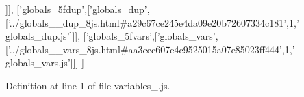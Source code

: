 \begin{DoxyCode}
  [\textcolor{stringliteral}{'globals\_5f\_5fvars\_5f8js'},[\textcolor{stringliteral}{'globals\_\_vars\_8js'},[\textcolor{stringliteral}{'
      ../globals\_\_\_\_vars\_\_8js\_8js.html#ad6fca56ff1358e43cb7802aaf72aa675'},1,\textcolor{stringliteral}{'globals\_\_vars\_8js.js'}]]],
  [\textcolor{stringliteral}{'globals\_5fdup'},[\textcolor{stringliteral}{'globals\_dup'},[\textcolor{stringliteral}{'../globals\_\_dup\_8js.html#a29c67ce245e4da09e20b72607334c181'},1,\textcolor{stringliteral}{'
      globals\_dup.js'}]]],
  [\textcolor{stringliteral}{'globals\_5fvars'},[\textcolor{stringliteral}{'globals\_vars'},[\textcolor{stringliteral}{'../globals\_\_vars\_8js.html#aa3cec607e4c9525015a07e85023ff444'},1,\textcolor{stringliteral}{'
      globals\_vars.js'}]]]
]
\end{DoxyCode}


Definition at line 1 of file variables\+\_.\+js.

